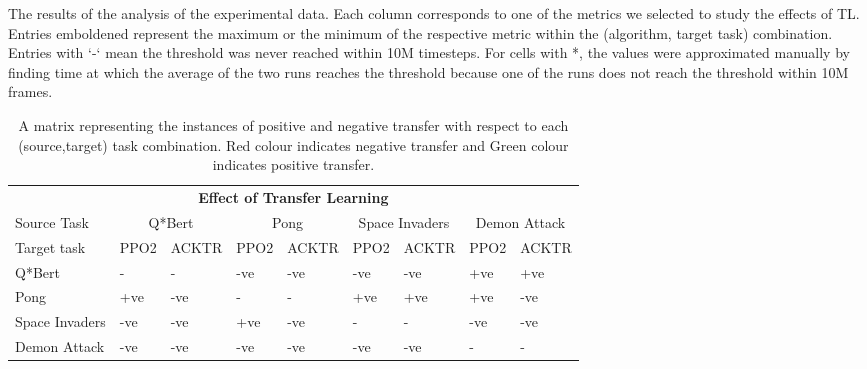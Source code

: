 \begin{table}[]
\endgroup
\caption{The results of the analysis of the experimental data. Each column corresponds to one of the metrics we selected to study the effects of TL. Entries emboldened represent the maximum or the minimum of the respective metric within the (algorithm, target task) combination. Entries with `-` mean the threshold was never reached within 10M timesteps. For cells with *, the values were approximated manually by finding time at which the average of the two runs reaches the threshold because one of the runs does not reach the threshold within 10M frames.}
\end{table}

\begin{table}[]
	\begingroup
	\begin{tabular}{p{3cm}p{1cm}p{1cm}p{1cm}p{1cm}p{1cm}p{1cm}p{1cm}p{1cm}}
		\multicolumn{9}{c}{\textbf{Effect of Transfer Learning}} \\
		Source Task & \multicolumn{2}{c}{Q*Bert} & \multicolumn{2}{c}{Pong} & \multicolumn{2}{c}{Space Invaders} & \multicolumn{2}{c}{Demon Attack} \\
		Target task & \cellcolor[HTML]{ECF4FF}PPO2 & \cellcolor[HTML]{ECF4FF}ACKTR & \cellcolor[HTML]{ECF4FF}PPO2 & \cellcolor[HTML]{ECF4FF}ACKTR & \cellcolor[HTML]{ECF4FF}PPO2 & \cellcolor[HTML]{ECF4FF}ACKTR & \cellcolor[HTML]{ECF4FF}PPO2 & \cellcolor[HTML]{ECF4FF}ACKTR \\
		Q*Bert & - & - & \cellcolor[HTML]{FFCE93}-ve & \cellcolor[HTML]{FFCE93}-ve & \cellcolor[HTML]{FFCE93}-ve & \cellcolor[HTML]{FFCE93}-ve & \cellcolor[HTML]{9AFF99}+ve & \cellcolor[HTML]{9AFF99}+ve \\
		Pong & \cellcolor[HTML]{9AFF99}+ve & \cellcolor[HTML]{FFCE93}-ve & - & - & \cellcolor[HTML]{9AFF99}+ve & \cellcolor[HTML]{9AFF99}+ve & \cellcolor[HTML]{9AFF99}+ve & \cellcolor[HTML]{FFCE93}-ve \\
		Space Invaders & \cellcolor[HTML]{FFCE93}-ve & \cellcolor[HTML]{FFCE93}-ve & \cellcolor[HTML]{9AFF99}+ve & \cellcolor[HTML]{FFCE93}-ve & - & - & \cellcolor[HTML]{FFCE93}-ve & \cellcolor[HTML]{FFCE93}-ve \\
		Demon Attack & \cellcolor[HTML]{FFCE93}-ve & \cellcolor[HTML]{FFCE93}-ve & \cellcolor[HTML]{FFCE93}-ve & \cellcolor[HTML]{FFCE93}-ve & \cellcolor[HTML]{FFCE93}-ve & \cellcolor[HTML]{FFCE93}-ve & - & -
	\end{tabular}
\endgroup
\caption{ A matrix representing the instances of positive and negative transfer with respect to each (source,target) task combination. Red colour indicates negative transfer and Green colour indicates positive transfer.}
\end{table}
